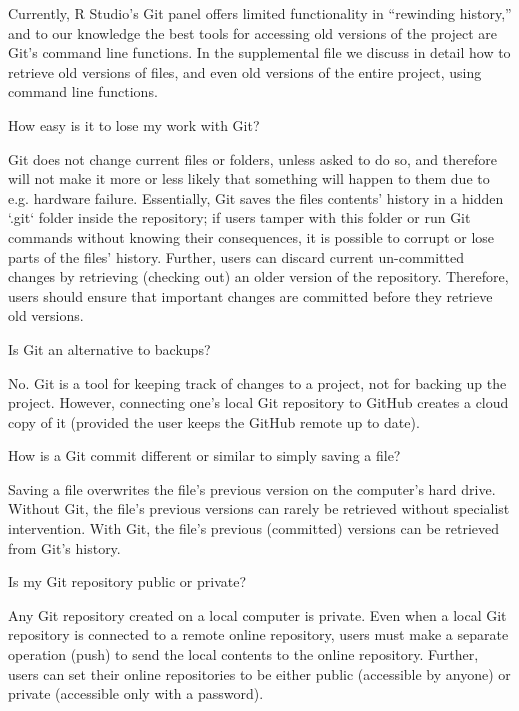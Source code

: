 \documentclass[
  american,
  ,doc,floatsintext]{apa6}
\begin{document}
Currently, R Studio's Git panel offers limited functionality in ``rewinding history,'' and to our knowledge the best tools for accessing old versions of the project are Git's command line functions. In the supplemental file we discuss in detail how to retrieve old versions of files, and even old versions of the entire project, using command line functions.

\begin{tcolorbox}[colframe=green!50!black, colback=green!5, fonttitle=\small\bfseries, fontupper=\small, title=Box 3. Common Git Misconceptions.]
How easy is it to lose my work with Git?
    \begin{compactitem}
    \item Git does not change current files or folders, unless asked to do so, and therefore will not make it more or less likely that something will happen to them due to e.g. hardware failure. Essentially, Git saves the files contents' history in a hidden `.git` folder inside the repository; if users tamper with this folder or run Git commands without knowing their consequences, it is possible to corrupt or lose parts of the files' history. Further, users can discard current un-committed changes by retrieving (checking out) an older version of the repository. Therefore, users should ensure that important changes are committed before they retrieve old versions.
    \end{compactitem}
\vspace{.5em}
Is Git an alternative to backups?
    \begin{compactitem}
    \item No. Git is a tool for keeping track of changes to a project, not for backing up the project. However, connecting one's local Git repository to GitHub creates a cloud copy of it (provided the user keeps the GitHub remote up to date).
    \end{compactitem}
\vspace{.5em}
How is a Git commit different or similar to simply saving a file?
    \begin{compactitem}
    \item Saving a file overwrites the file's previous version on the computer's hard drive. Without Git, the file's previous versions can rarely be retrieved without specialist intervention. With Git, the file's previous (committed) versions can be retrieved from Git's history.
    \end{compactitem}
\vspace{.5em}
Is my Git repository public or private?
    \begin{compactitem}
    \item Any Git repository created on a local computer is private. Even when a local Git repository is connected to a remote online repository, users must make a separate operation (push) to send the local contents to the online repository. Further, users can set their online repositories to be either public (accessible by anyone) or private (accessible only with a password).
    \end{compactitem}
\end{tcolorbox}
\end{document}
